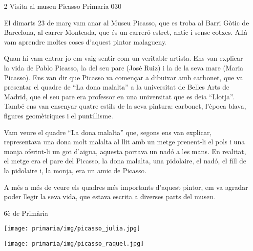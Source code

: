 \begin{news}
{2} %
{Visita al museu Picasso}
{}
{Primaria}
{030} %


El dimarts 23 de març vam anar al Museu Picasso, que es troba al Barri Gòtic de Barcelona, al carrer Montcada, que és un carreró estret, antic i sense cotxes. Allà vam aprendre moltes coses d’aquest pintor malagueny.  

Quan hi vam entrar jo em vaig sentir com un veritable artista. Ens van explicar la vida de Pablo Picasso, la del seu pare (José Ruiz) i la de la seva mare (Maria Picasso). Ens van dir que Picasso va començar a dibuixar amb carbonet, que va presentar el quadre de “La dona malalta” a la universitat de Belles Arts de Madrid, que el seu pare era  professor en una universitat que es deia “Llotja”. També ens van ensenyar quatre estils de la seva pintura: carbonet, l’època blava, figures geomètriques i el puntillisme. 

Vam veure el quadre “La dona malalta” que, segons ens van explicar,  representava una dona molt malalta al llit amb un metge prenent-li el pols i una monja oferint-li un got d’aigua, aquesta portava un nadó a les mans. En realitat, el metge era el pare del Picasso, la dona malalta, una pidolaire, el nadó, el fill de la pidolaire i, la monja, era un amic de Picasso.

A més a més de veure els quadres més importants d’aquest pintor, em va agradar poder llegir la seva vida, que estava escrita a diverses parts del museu. 

				{6è de Primària}

\noindent\texttt{[image: primaria/img/picasso\_julia.jpg]}

\noindent\texttt{[image: primaria/img/picasso\_raquel.jpg]}

\end{news}
